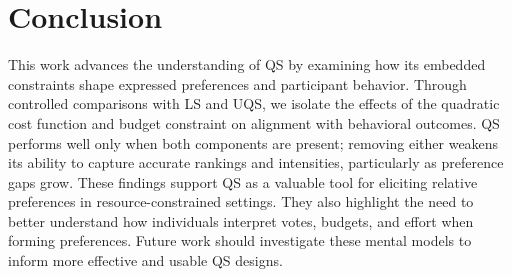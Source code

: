 \section{Conclusion}
This work advances the understanding of QS by examining how its embedded constraints shape expressed preferences and participant behavior. Through controlled comparisons with LS and UQS, we isolate the effects of the quadratic cost function and budget constraint on alignment with behavioral outcomes. QS performs well only when both components are present; removing either weakens its ability to capture accurate rankings and intensities, particularly as preference gaps grow. These findings support QS as a valuable tool for eliciting relative preferences in resource-constrained settings. They also highlight the need to better understand how individuals interpret votes, budgets, and effort when forming preferences. Future work should investigate these mental models to inform more effective and usable QS designs.